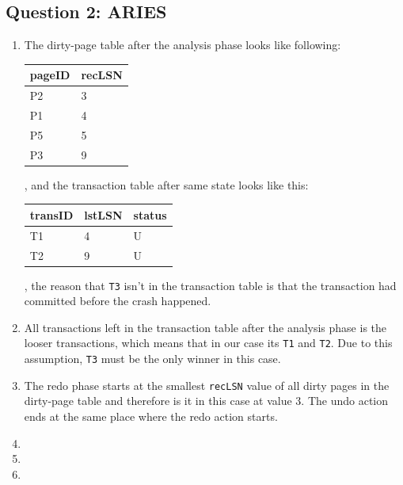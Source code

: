 \documentclass[10pt,a4paper]{article}
\begin{document}
\subsection*{Question 2: ARIES}
\begin{enumerate}
	\item The dirty-page table after the analysis phase looks like following:
		\begin{center}
		\begin{tabular}{|l|l|}
			\hline
			\textbf{pageID} & \textbf{recLSN} \\ \hline
			P2 & 3 \\ \hline
			P1 & 4 \\ \hline
			P5 & 5 \\ \hline
			P3 & 9 \\ \hline
		\end{tabular}
		\end{center}
		, and the transaction table after same state looks like this:
		\begin{center}
		\begin{tabular}{|l|l|l|}
			\hline
			\textbf{transID} & \textbf{lstLSN} & \textbf{status} \\ \hline
			T1 & 4 & U \\ \hline
			T2 & 9 & U \\ \hline
		\end{tabular}
		\end{center}
		, the reason that \texttt{T3} isn't in the transaction table is that the transaction had committed before the crash happened.
	\item All transactions left in the transaction table after the analysis phase is the looser transactions, which means that in our case its \texttt{T1} and \texttt{T2}. Due to this assumption, \texttt{T3} must be the only winner in this case.
	\item The redo phase starts at the smallest \texttt{recLSN} value of all dirty pages in the dirty-page table and therefore is it in this case at value 3. The undo action ends at the same place where the redo action starts. 
	\item
	\item
	\item
\end{enumerate}
\end{document}
